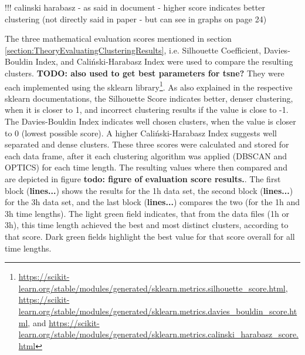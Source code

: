 !!! calinski harabasz - as said in document - higher score indicates better clustering (not directly said in paper - but can see in graphs on page 24)

The three mathematical evaluation scores mentioned in section \ref{section:TheoryEvaluatingClusteringResults}, i.e. Silhouette Coefficient, Davies-Bouldin Index, and Caliński-Harabasz Index were used to compare the resulting clusters. \textbf{TODO: also used to get best parameters for tsne?} They were each implemented using the sklearn library\footnote{\url{https://scikit-learn.org/stable/modules/generated/sklearn.metrics.silhouette_score.html}, \url{https://scikit-learn.org/stable/modules/generated/sklearn.metrics.davies_bouldin_score.html}, and \url{https://scikit-learn.org/stable/modules/generated/sklearn.metrics.calinski_harabasz_score.html}}.
As also explained in the respective sklearn documentations, the Silhouette Score indicates better, denser clustering, when it is closer to 1, and incorrect clustering results if the value is close to -1. The Davies-Bouldin Index indicates well chosen clusters, when the value is closer to 0 (lowest possible score). A higher Caliński-Harabasz Index suggests well separated and dense clusters.
These three scores were calculated and stored for each data frame, after it each clustering algorithm was applied (DBSCAN and OPTICS) for each time length. The resulting values where then compared and are depicted in figure \textbf{todo: figure of evaluation score results.}. The first block (\textbf{lines...}) shows the results for the 1h data set, the second block (\textbf{lines...}) for the 3h data set, and the last block (\textbf{lines...}) compares the two (for the 1h and 3h time lengths). The light green field indicates, that from the data files (1h or 3h), this time length achieved the best and most distinct clusters, according to that score. Dark green fields highlight the best value for that score overall for all time lengths.
